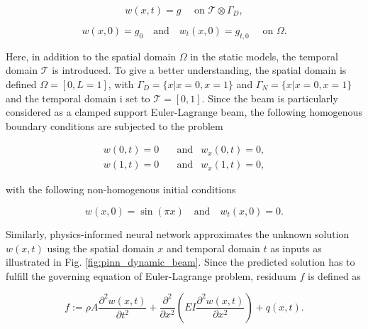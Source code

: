 \begin{equation}
    \label{eq:dynamic_beam_3}
    w(x,t) = g \quad \text { on } \mathcal{T} \otimes \Gamma_{D},
\end{equation} 

\begin{equation}
    \label{eq:dynamic_beam_4}
    w(x,0) = g_{0} \quad \text{and} \quad w_{t}(x,0) = g_{t,0} \quad \text { on } \Omega.
\end{equation} 

Here, in addition to the spatial domain $\Omega$ in the static models, the temporal domain $\mathcal{T}$ is introduced. 
To give a better understanding, the spatial domain is defined $\Omega = [0,L=1]$, 
with $\Gamma_{D}= \{x | x = 0, x = 1\}$ and $\Gamma_{N}= \{x | x = 0, x = 1\}$ and 
the temporal domain i set to $\mathcal{T}=[0,1]$. Since the beam is particularly considered as a clamped support
Euler-Lagrange beam, the following homogenous boundary conditions are subjected to the problem 

\begin{equation}
    \begin{aligned}
    \label{eq:dynamic_beam_bc}
    w(0,t)=0 & \quad \text{and} & w_{x}(0,t)=0, \\
    w(1,t)=0 & \quad \text{and} & w_{x}(1,t)=0,
    \end{aligned}
\end{equation}

\vspace{5mm}
\noindent with the following non-homogenous initial conditions 

\begin{equation}
    \label{eq:dynamic_beam_ic}
    w(x,0)=\sin(\pi x) \quad \text{and} \quad w_{t}(x,0)=0.
\end{equation}

Similarly, physics-informed neural network approximates the unknown solution $w(x,t)$ using the spatial domain $x$ 
and temporal domain $t$ as inputs as illustrated in Fig. \ref{fig:pinn_dynamic_beam}. Since the predicted solution
has to fulfill the governing equation of Euler-Lagrange problem, residuum $f$ is defined as

\begin{equation}
    \label{eq:f_dynamic}
    f:=\rho A \frac{\partial^{2} w(x,t)}{\partial t^{2}} + \frac{\partial^{2}}{\partial x^{2}}\left(E I \frac{\partial^{2} w(x,t)}{\partial x^{2}}\right) + q(x, t).
\end{equation}

